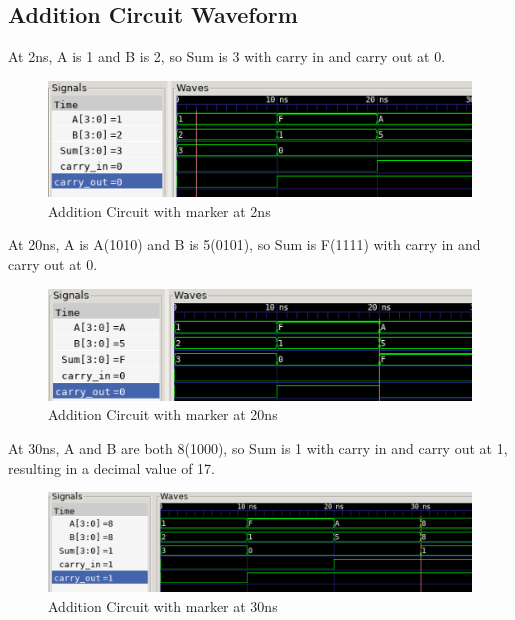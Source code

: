 \documentclass[12pt]{article}
\begin{document}
\subsection{Addition Circuit Waveform} 

At 2ns, A is 1 and B is 2, so Sum is 3 with  carry in and carry out at 0.

\begin{figure}[H]
 \centering
 \includegraphics[width = 1.0\textwidth]{Addition/addition_wave.png}
 \caption{Addition Circuit with marker at 2ns}
 \label{fig:enter-label} 
\end{figure} 

At 20ns, A is A(1010) and B is 5(0101), so Sum is F(1111) with carry in and carry out at 0.
 \begin{figure}[H]
 \centering 
\includegraphics[width = 1.0\textwidth]{Addition/addition_wave1.png}
 \caption{Addition Circuit with marker at 20ns}
 \label{fig:enter-label}
 \end{figure}

 At 30ns, A and B are both 8(1000), so Sum is 1 with carry in and carry out at 1, resulting in a decimal value of 17.
 \begin{figure}[H]
 \centering 
\includegraphics[width = 1.0\textwidth]{Addition/addition_wave2.png}
 \caption{Addition Circuit with marker at 30ns}
 \label{fig:enter-label}
 \end{figure}
\end{document}
